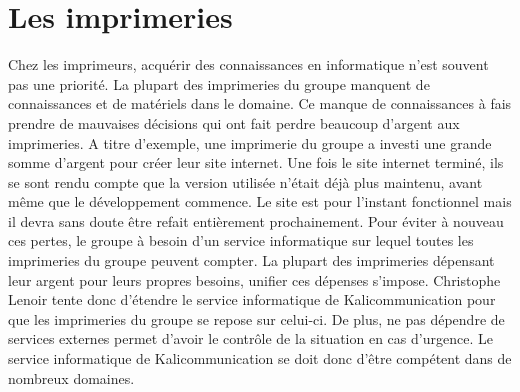 
\section{Les imprimeries}
Chez les imprimeurs, acquérir des connaissances en informatique n'est souvent pas une priorité. La plupart des imprimeries du groupe manquent de connaissances et de matériels dans le domaine. Ce manque de connaissances à fais prendre de mauvaises décisions qui ont fait perdre beaucoup d'argent aux imprimeries.\newline
A titre d'exemple, une imprimerie du groupe a investi une grande somme d'argent pour créer leur site internet. Une fois le site internet terminé, ils se sont rendu compte que la version utilisée n'était déjà plus maintenu, avant même que le développement commence. Le site est pour l'instant fonctionnel mais il devra sans doute être refait entièrement prochainement.\newline
Pour éviter à nouveau ces pertes, le groupe à besoin d'un service informatique sur lequel toutes les imprimeries du groupe peuvent compter. La plupart des imprimeries dépensant leur argent pour leurs propres besoins, unifier ces dépenses s'impose. Christophe Lenoir tente donc d'étendre le service informatique de Kalicommunication pour que les imprimeries du groupe se repose sur celui-ci. De plus, ne pas dépendre de services externes permet d'avoir le contrôle de la situation en cas d'urgence. Le service informatique de Kalicommunication se doit donc d'être compétent dans de nombreux domaines.

